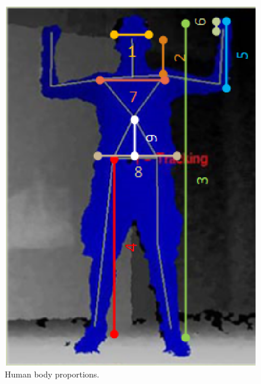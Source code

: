 \documentclass[number,preprint,review,12pt]{elsarticle}
\begin{document}
\begin{figure}
	\begin{center}
			\includegraphics[width=0.70\columnwidth]{body_proportions.eps}
	\end{center}
	\caption{Human body proportions.}
	\label{fig:body_proportions}
\end{figure}
\end{document}
